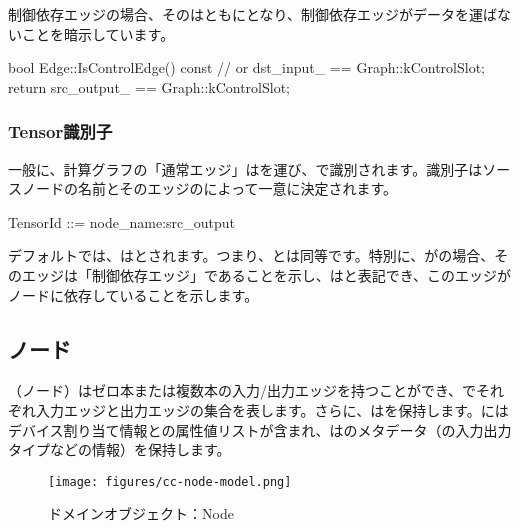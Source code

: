 \begin{content}
制御依存エッジの場合、そのはともにとなり、制御依存エッジがデータを運ばないことを暗示しています。

\begin{leftbar}
\begin{c++}
bool Edge::IsControlEdge() const {
   // or dst\_input\_ == Graph::kControlSlot;
   return src_output_ == Graph::kControlSlot;
}
\end{c++}
\end{leftbar}

\subsubsection{Tensor識別子}

一般に、計算グラフの「通常エッジ」はを運び、で識別されます。識別子はソースノードの名前とそのエッジのによって一意に決定されます。

\begin{leftbar}
\begin{c++}
TensorId ::= node_name:src_output
\end{c++}
\end{leftbar}

デフォルトでは、はとされます。つまり、とは同等です。特別に、がの場合、そのエッジは「制御依存エッジ」であることを示し、はと表記でき、このエッジがノードに依存していることを示します。

\subsection{ノード}

（ノード）はゼロ本または複数本の入力/出力エッジを持つことができ、でそれぞれ入力エッジと出力エッジの集合を表します。さらに、はを保持します。にはデバイス割り当て情報との属性値リストが含まれ、はのメタデータ（の入力出力タイプなどの情報）を保持します。

\begin{figure}[H]
\centering
\texttt{[image: figures/cc-node-model.png]}
\caption{ドメインオブジェクト：Node}
 \label{fig:cc-node-model}
\end{figure}


\end{content}
